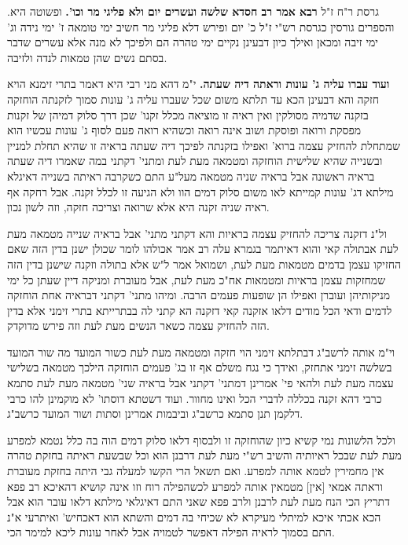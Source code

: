 \documentclass[12pt, openany]{book}
\newcommand{\sethebfont}{
\fontsize{10.5pt}{21.0pt} \selectfont
}
\newcommand{\twocol}[1]{
	{\sethebfont \begin{multicols}{2}
			#1
	\end{multicols}}	
}
\begin{document}
\twocol{ גרסת ר"ח ז"ל \textbf{רבא אמר רב חסדא שלשה ועשרים יום ולא פליגי מר וכו'.}  ופשוטה היא. והספרים גורסין כגרסת רש"י ז"ל כ' יום ופירש דלא פליגי מר חשיב ימי טומאה ז' ימי נידה וג' ימי זיבה ומכאן ואילך כיון דבעינן נקיים ימי טהרה הם ולפיכך לא מנה אלא עשרים שדבר בסתם נשים שהן טמאות לנדה ולזיבה. 
\par\textbf{ועוד עברו עליה ג' עונות וראתה דיה שעתה.}  י"מ דהא מני רבי היא דאמר בתרי זימנא הויא חזקה והא דבעינן הכא עד תלתא משום שכל שעברו עליה ג' עונות סמוך לזקנתה הוחזקה בזקנה שדמיה מסולקין ואין ראיה זו מוציאה מכלל זקנו' שכן דרך סלוק דמיהן של זקנות מפסקת ורואה ופוסקת ושוב אינה רואה וכשהיא רואה פעם לסוף ג' עונות עכשיו הוא שמתחלת להחזיק עצמה ברוא' ואפילו בזקנתה לפיכך דיה שעתה בראיה זו שהיא תחלת למניין ובשנייה שהיא שלישית הוחזקה ומטמאה מעת לעת ומתני' דקתני במה שאמרו דיה שעתה בראיה ראשונה אבל בראיה שניה מטמאה מעל"ע התם כשקרבה ראיתה בשנייה דאיגלא מילתא דג' עונות קמייתא לאו משום סלוק דמים הוו ולא הגיעה זו לכלל זקנה. אבל רחקה אף ראיה שניה זקנה היא אלא שרואה וצריכה חזקה, וזה לשון נכון.\par  ול"נ דזקנה צריכה להחזיק עצמה בראיות והא דקתני מתני' אבל בראיה שנייה מטמאה מעת לעת אבתולה קאי והוא דאיתמר בגמרא עלה רב אמר אכולהו לומר שכולן ישנן בדין הזה שאם החזיקו עצמן בדמים מטמאות מעת לעת, ושמואל אמר ל"ש אלא בתולה וזקנה שישנן בדין הזה שמחזקות עצמן בראיות ומטמאות אח"כ מעת לעת, אבל מעוברת ומניקה דיין שעתן כל ימי מניקותיהן ועוברן ואפילו הן שופעות פעמים הרבה. ומיהו מתני' דקתני דבראיה אחת הוחזקה לדמים ודאי הכל מודים דלאו אזקנה קאי דזקנה הא קתני לה בבתרייתא בתרי זימני אלא בדין הזה להחזיק עצמה כשאר הנשים מעת לעת וזה פירש מדוקדק.\par  וי"מ אותה לרשב"ג דבתלתא זימני הוי חזקה ומטמאה מעת לעת כשור המועד מה שור המועד בשלשה זימני אתחזק, ואידך כי נגח משלם אף זו בג' פעמים הוחזקה הילכך מטמאה בשלישי עצמה מעת לעת ולהאי פי' אמרינן דמתני' דקתני אבל בראיה שני' מטמאה מעת לעת סתמא כרבי דהא זקנה בכללה לדברי הכל ואינו מחוור. ועוד דשטתא דוסתו' לא מוקמינן להו כרבי דלקמן תנן סתמא כרשב"ג וביבמות אמרינן וסתות ושור המועד כרשב"ג.\par  ולכל הלשונות נמי קשיא כיון שהוחזקה זו ולבסוף דלאו סלוק דמים הוה בה כלל נטמא למפרע מעת לעת שבכל ראיותיה והשיב רש"י מעת לעת דרבנן הוא וכל שבשעת ראיתה בחזקת טהרה אין מחמירין לטמא אותה למפרע. ואם תשאל הרי הקשו למעלה גבי היתה בחזקת מעוברת וראתה אמאי [אין] מטמאין אותה למפרע לכשהפילה רוח וזו אינה קושיא דהאיכא רב פפא דתריץ הכי הנח מעת לעת לרבנן ולרב פפא שאני התם דאיגלאי מילתא דלאו עובר הוא אבל הכא אכתי איכא למיתלי מעיקרא לא שכיחי בה דמים והשתא הוא דאכחיש' ואיתרעי א"נ התם בסמוך לראיה הפילה דאפשר לטמויה אבל לאחר עונות ליכא למימר הכי. 
}
\end{document}
